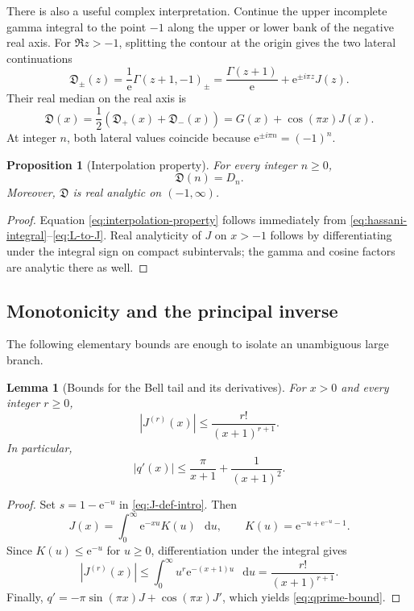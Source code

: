 \documentclass[11pt,oneside]{article}
\theoremstyle{plain}
\newtheorem{proposition}[theorem]{Proposition}
\newtheorem{lemma}[theorem]{Lemma}
\theoremstyle{definition}
\theoremstyle{remark}
\newcommand{\ee}{\mathrm{e}}
\newcommand{\dd}{\mathop{}\!\mathrm{d}}
\newcommand{\Dfrak}{\mathfrak{D}}
\newcommand{\abs}[1]{\left\lvert#1\right\rvert}
\begin{document}
There is also a useful complex interpretation.  Continue the upper incomplete
gamma integral to the point \(-1\) along the upper or lower bank of the
negative real axis.  For \(\Re z>-1\), splitting the contour at the origin
gives the two lateral continuations
\begin{equation}
 \Dfrak_{\pm}(z)=\frac{1}{\ee}\Gamma(z+1,-1)_{\pm}
 =\frac{\Gamma(z+1)}{\ee}+\ee^{\pm i\pi z}J(z).
 \label{eq:lateral-D}
\end{equation}
Their real median on the real axis is
\begin{equation}
 \Dfrak(x)=\frac12\left(\Dfrak_+(x)+\Dfrak_-(x)\right)
 =G(x)+\cos(\pi x)J(x).
 \label{eq:median-D}
\end{equation}
At integer \(n\), both lateral values coincide because
\(\ee^{\pm i\pi n}=(-1)^n\).

\begin{proposition}[Interpolation property]
\label{prop:interpolation}
For every integer \(n\ge0\),
\begin{equation}
 \Dfrak(n)=D_n.
 \label{eq:interpolation-property}
\end{equation}
Moreover, \(\Dfrak\) is real analytic on \((-1,\infty)\).
\end{proposition}
\begin{proof}
Equation \eqref{eq:interpolation-property} follows immediately from
\eqref{eq:hassani-integral}--\eqref{eq:L-to-J}.  Real analyticity of \(J\)
on \(x>-1\) follows by differentiating under the integral sign on compact
subintervals; the gamma and cosine factors are analytic there as well.
\end{proof}

\subsection{Monotonicity and the principal inverse}

The following elementary bounds are enough to isolate an unambiguous large
branch.

\begin{lemma}[Bounds for the Bell tail and its derivatives]
\label{lem:J-derivative-bound}
For \(x>0\) and every integer \(r\ge0\),
\begin{equation}
 \abs{J^{(r)}(x)}\le\frac{r!}{(x+1)^{r+1}}.
 \label{eq:J-derivative-bound}
\end{equation}
In particular,
\begin{equation}
 \abs{q'(x)}\le\frac{\pi}{x+1}+\frac{1}{(x+1)^2}.
 \label{eq:qprime-bound}
\end{equation}
\end{lemma}
\begin{proof}
Set \(s=1-\ee^{-u}\) in \eqref{eq:J-def-intro}.  Then
\begin{equation}
 J(x)=\int_0^\infty\ee^{-xu}K(u)\,\dd u,
 \qquad
 K(u)=\ee^{-u+\ee^{-u}-1}.
 \label{eq:J-Laplace-preview}
\end{equation}
Since \(K(u)\le\ee^{-u}\) for \(u\ge0\), differentiation under the integral
gives
\[
 \abs{J^{(r)}(x)}
 \le\int_0^\infty u^r\ee^{-(x+1)u}\,\dd u
 =\frac{r!}{(x+1)^{r+1}}.
\]
Finally,
\(q'=-\pi\sin(\pi x)J+\cos(\pi x)J'\), which yields
\eqref{eq:qprime-bound}.
\end{proof}
\end{document}
